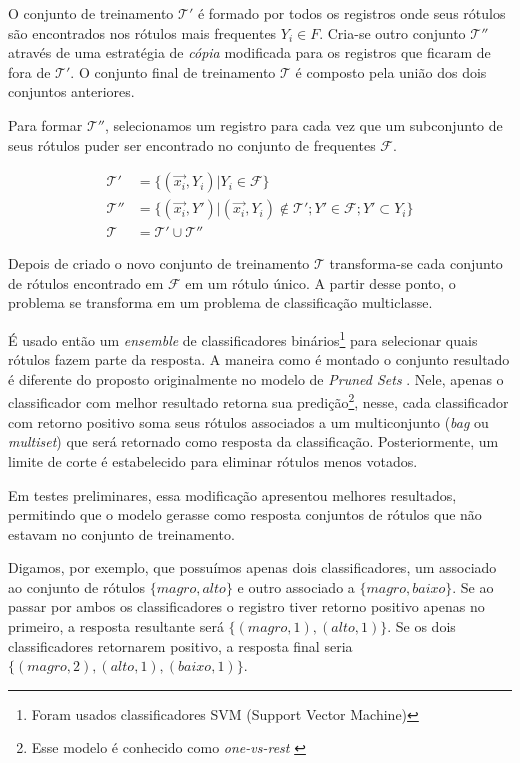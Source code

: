 \documentclass[runningheads,a4paper]{llncs}
\begin{document}
O conjunto de treinamento $\mathcal{T'}$ é formado por todos os registros onde seus rótulos são encontrados nos rótulos mais frequentes $Y_i \in F$. Cria-se outro conjunto $\mathcal{T''}$ através de uma estratégia de \textit{cópia} modificada para os registros que ficaram de fora de $\mathcal{T'}$. O conjunto final de treinamento $\mathcal{T}$ é composto pela união dos dois conjuntos anteriores.

Para formar $\mathcal{T''}$, selecionamos um registro para cada vez que um subconjunto de seus rótulos puder ser encontrado no conjunto de frequentes $\mathcal{F}$.

\begin{align*}
\mathcal{T'} &= \{(\vec{x_i}, Y_i) | Y_i \in \mathcal{F}\} \\
\mathcal{T''} &=  \{(\vec{x_i}, Y') | (\vec{x_i}, Y_i) \notin \mathcal{T'}; Y' \in \mathcal{F}; Y' \subset Y_i \} \\
\mathcal{T} &=  \mathcal{T'} \cup \mathcal{T''}
\end{align*}

Depois de criado o novo conjunto de treinamento $\mathcal{T}$ transforma-se cada conjunto de rótulos encontrado em $\mathcal{F}$ em um rótulo único. A partir desse ponto, o problema se transforma em um problema de classificação multiclasse.

É usado então um \textit{ensemble} de classificadores binários\footnote{Foram usados classificadores SVM (Support Vector Machine)} para selecionar quais rótulos fazem parte da resposta. A maneira como é montado o conjunto resultado é diferente do proposto originalmente no modelo de \textit{Pruned Sets} \cite{Read2008-bt}. Nele, apenas o classificador com melhor resultado retorna sua predição\footnote{Esse modelo é conhecido como \textit{one-vs-rest} \cite{Bishop2006-vm}}, nesse, cada classificador com retorno positivo soma seus rótulos associados a um multiconjunto (\textit{bag} ou \textit{multiset}) que será retornado como resposta da classificação. Posteriormente, um limite de corte é estabelecido para eliminar rótulos menos votados.

Em testes preliminares, essa modificação apresentou melhores resultados, permitindo que o modelo gerasse como resposta conjuntos de rótulos que não estavam no conjunto de treinamento.

Digamos, por exemplo, que possuímos apenas dois classificadores, um associado ao conjunto de rótulos $\{magro, alto\}$ e outro associado a $\{magro, baixo\}$. Se ao passar por ambos os classificadores o registro tiver retorno positivo apenas no primeiro, a resposta resultante será $\{(magro, 1), (alto, 1)\}$. Se os dois classificadores retornarem positivo, a resposta final seria $\{(magro, 2), (alto, 1), (baixo, 1)\}$.
\end{document}
